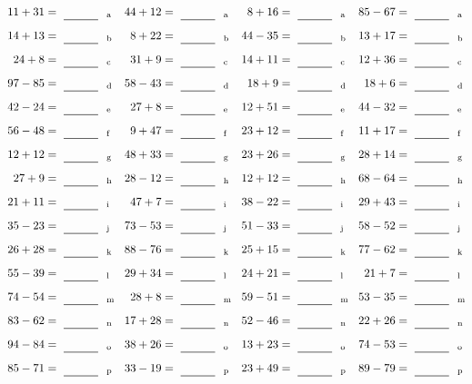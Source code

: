 \documentclass
[
  draft    = true,
  fontsize = 11pt,
  parskip  = half-
]
{scrartcl}
\begin{document}
\clearpage
\begin{align*}
    \pline{11+31}&=\rline{a}
  & \pline{44+12}&=\rline{a}
  & \pline{8+16}&=\rline{a}
  & \pline{85-67}&=\rline{a} \\[1ex]
    \pline{14+13}&=\rline{b}
  & \pline{8+22}&=\rline{b}
  & \pline{44-35}&=\rline{b}
  & \pline{13+17}&=\rline{b} \\[1ex]
    \pline{24+8}&=\rline{c}
  & \pline{31+9}&=\rline{c}
  & \pline{14+11}&=\rline{c}
  & \pline{12+36}&=\rline{c} \\[1ex]
    \pline{97-85}&=\rline{d}
  & \pline{58-43}&=\rline{d}
  & \pline{18+9}&=\rline{d}
  & \pline{18+6}&=\rline{d} \\[1ex]
    \pline{42-24}&=\rline{e}
  & \pline{27+8}&=\rline{e}
  & \pline{12+51}&=\rline{e}
  & \pline{44-32}&=\rline{e} \\[1ex]
    \pline{56-48}&=\rline{f}
  & \pline{9+47}&=\rline{f}
  & \pline{23+12}&=\rline{f}
  & \pline{11+17}&=\rline{f} \\[1ex]
    \pline{12+12}&=\rline{g}
  & \pline{48+33}&=\rline{g}
  & \pline{23+26}&=\rline{g}
  & \pline{28+14}&=\rline{g} \\[1ex]
    \pline{27+9}&=\rline{h}
  & \pline{28-12}&=\rline{h}
  & \pline{12+12}&=\rline{h}
  & \pline{68-64}&=\rline{h} \\[1ex]
    \pline{21+11}&=\rline{i}
  & \pline{47+7}&=\rline{i}
  & \pline{38-22}&=\rline{i}
  & \pline{29+43}&=\rline{i} \\[1ex]
    \pline{35-23}&=\rline{j}
  & \pline{73-53}&=\rline{j}
  & \pline{51-33}&=\rline{j}
  & \pline{58-52}&=\rline{j} \\[1ex]
    \pline{26+28}&=\rline{k}
  & \pline{88-76}&=\rline{k}
  & \pline{25+15}&=\rline{k}
  & \pline{77-62}&=\rline{k} \\[1ex]
    \pline{55-39}&=\rline{l}
  & \pline{29+34}&=\rline{l}
  & \pline{24+21}&=\rline{l}
  & \pline{21+7}&=\rline{l} \\[1ex]
    \pline{74-54}&=\rline{m}
  & \pline{28+8}&=\rline{m}
  & \pline{59-51}&=\rline{m}
  & \pline{53-35}&=\rline{m} \\[1ex]
    \pline{83-62}&=\rline{n}
  & \pline{17+28}&=\rline{n}
  & \pline{52-46}&=\rline{n}
  & \pline{22+26}&=\rline{n} \\[1ex]
    \pline{94-84}&=\rline{o}
  & \pline{38+26}&=\rline{o}
  & \pline{13+23}&=\rline{o}
  & \pline{74-53}&=\rline{o} \\[1ex]
    \pline{85-71}&=\rline{p}
  & \pline{33-19}&=\rline{p}
  & \pline{23+49}&=\rline{p}
  & \pline{89-79}&=\rline{p}
\end{align*}
\end{document}
